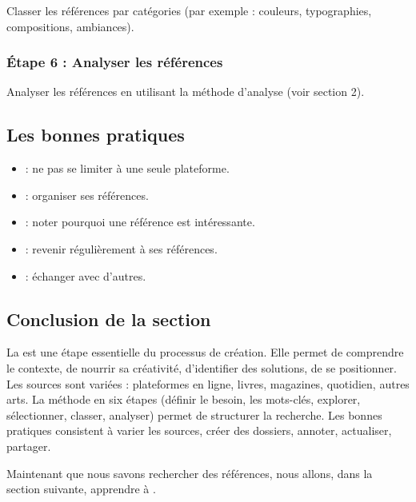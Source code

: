 Classer les références par catégories (par exemple : couleurs, typographies, compositions, ambiances).

\subsubsection{Étape 6 : Analyser les références}

Analyser les références en utilisant la méthode d'analyse (voir section 2).

\subsection{Les bonnes pratiques}

\begin{itemize}
    \item {} : ne pas se limiter à une seule plateforme.
    \item {} : organiser ses références.
    \item {} : noter pourquoi une référence est intéressante.
    \item {} : revenir régulièrement à ses références.
    \item {} : échanger avec d'autres.
\end{itemize}

\subsection*{Conclusion de la section}

\begin{retenir}
La  est une étape essentielle du processus de création. Elle permet de comprendre le contexte, de nourrir sa créativité, d'identifier des solutions, de se positionner. Les sources sont variées : plateformes en ligne, livres, magazines, quotidien, autres arts. La méthode en six étapes (définir le besoin, les mots-clés, explorer, sélectionner, classer, analyser) permet de structurer la recherche. Les bonnes pratiques consistent à varier les sources, créer des dossiers, annoter, actualiser, partager.
\end{retenir}

Maintenant que nous savons rechercher des références, nous allons, dans la section suivante, apprendre à .

